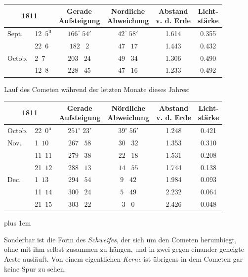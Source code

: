 \begin{center}\fontsize{10}{12}\selectfont\setlength{\tabcolsep}{3pt}\renewcommand{\arraystretch}{1.15}\begin{tabular}{ll|c|c|c|c}
\multicolumn{2}{c|}{1811} & \shortstack{Gerade\\Aufsteigung} & \shortstack{Nordliche\\Abweichung} & \shortstack{Abstand\\v. d. Erde} & \shortstack{Licht-\\stärke} \\\hline
Sept. & 12\ $5^{\mathrm u}$ & $166^\circ\;54'$ & $42^\circ\;58'$ & 1.614 & 0.355 \\
 & 22\ $6$ & $182\;\;\;2$ & $47\;\;\;17$ & 1.443 & 0.432 \\
Octob. & 2\ $7$ & $203\;\;\;24$ & $49\;\;\;34$ & 1.306 & 0.490 \\
 & 12\ $8$ & $228\;\;\;45$ & $47\;\;\;16$ & 1.233 & 0.492 \\
\end{tabular}
\end{center}

\noindent Lauf des Cometen während der letzten Monate dieses Jahres:

\begin{center}\fontsize{10}{12}\selectfont\setlength{\tabcolsep}{3pt}\renewcommand{\arraystretch}{1.15}\begin{tabular}{ll|c|c|c|c}
\multicolumn{2}{c|}{1811} & \shortstack{Gerade\\Aufsteigung} & \shortstack{Nördliche\\Abweichung} & \shortstack{Abstand\\v. d. Erde} & \shortstack{Licht-\\stärke} \\\hline
Octob. & 22\ $0^{\mathrm u}$ & $251^\circ\;23'$ & $39^\circ\;56'$ & 1.248 & 0.421 \\
Nov. & 1\ $10$ & $267\;\;\;58$ & $30\;\;\;32$ & 1.353 & 0.310 \\
 & 11\ $11$ & $279\;\;\;38$ & $22\;\;\;18$ & 1.531 & 0.208 \\
 & 21\ $12$ & $288\;\;\;13$ & $14\;\;\;55$ & 1.744 & 0.138 \\
Dec. & 1\ $13$ & $294\;\;\;54$ & $9\;\;\;42$ & 1.984 & 0.093 \\
 & 11\ $14$ & $300\;\;\;24$ & $5\;\;\;49$ & 2.232 & 0.064 \\
 & 21\ $15$ & $303\;\;\;22$ & $3\;\;\;0$ & 2.426 & 0.048 \\
\end{tabular}
\end{center}

{\rightskip=0pt plus 1em\par\indent Sonderbar ist die Form des \emph{Schweifes}, der sich um den Cometen herumbiegt, ohne mit ihm selbst zusammen zu hängen, und in zwei gegen einander geneigte Aeste ausläuft. Von einem eigentlichen \emph{Kerne} ist übrigens in dem Cometen gar keine Spur zu sehen.\par}

